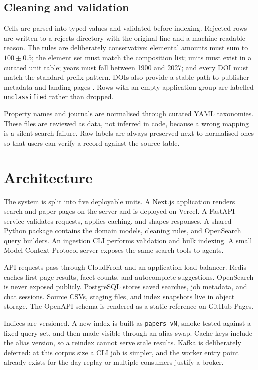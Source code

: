 \documentclass[11pt,a4paper]{article}
\begin{document}
\subsection{Cleaning and validation}

Cells are parsed into typed values and validated before indexing. Rejected rows
are written to a rejects directory with the original line and a machine-readable
reason. The rules are deliberately conservative: elemental amounts must sum to
$100 \pm 0.5$; the element set must match the composition list; units must exist
in a curated unit table; years must fall between 1900 and 2027; and every DOI
must match the standard prefix pattern. DOIs also provide a stable path to
publisher metadata and landing pages \citep{hendricks2020}. Rows with an empty
application group are labelled \texttt{unclassified} rather than dropped.

Property names and journals are normalised through curated YAML taxonomies.
These files are reviewed as data, not inferred in code, because a wrong mapping
is a silent search failure. Raw labels are always preserved next to normalised
ones so that users can verify a record against the source table.

\section{Architecture}

The system is split into five deployable units. A Next.js application renders
search and paper pages on the server and is deployed on Vercel. A FastAPI service
validates requests, applies caching, and shapes responses. A shared Python package
contains the domain models, cleaning rules, and OpenSearch query builders. An
ingestion CLI performs validation and bulk indexing. A small Model Context
Protocol server exposes the same search tools to agents.

API requests pass through CloudFront and an application load balancer. Redis
caches first-page results, facet counts, and autocomplete suggestions. OpenSearch
is never exposed publicly. PostgreSQL stores saved searches, job metadata, and
chat sessions. Source CSVs, staging files, and index snapshots live in object
storage. The OpenAPI schema is rendered as a static reference on GitHub Pages.

Indices are versioned. A new index is built as \texttt{papers\_vN}, smoke-tested
against a fixed query set, and then made visible through an alias swap. Cache keys
include the alias version, so a reindex cannot serve stale results. Kafka is
deliberately deferred: at this corpus size a CLI job is simpler, and the worker
entry point already exists for the day replay or multiple consumers justify a
broker.
\end{document}
